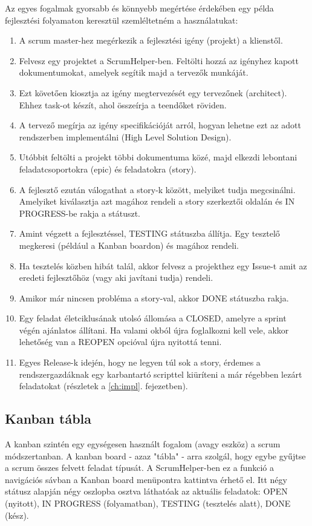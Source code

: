 Az egyes fogalmak gyorsabb és könnyebb megértése érdekében egy példa fejlesztési folyamaton keresztül szemléltetném a használatukat:

\begin{enumerate}
	\item A scrum master-hez megérkezik a fejlesztési igény (projekt) a klienstől.
	\item Felvesz egy projektet a ScrumHelper-ben. Feltölti hozzá az igényhez kapott dokumentumokat, amelyek segítik majd a tervezők munkáját.
	\item Ezt követően kiosztja az igény megtervezését egy tervezőnek (architect). Ehhez task-ot készít, ahol összeírja a teendőket röviden.
	\item A tervező megírja az igény specifikációját arról, hogyan lehetne ezt az adott rendszerben implementálni (High Level Solution Design).
	\item Utóbbit feltölti a projekt többi dokumentuma közé, majd elkezdi lebontani feladatcsoportokra (epic) és feladatokra (story).
	\item A fejlesztő ezután válogathat a story-k között, melyiket tudja megcsinálni. Amelyiket kiválasztja azt magához rendeli a story szerkeztői oldalán és IN PROGRESS-be rakja a státuszt.
	\item Amint végzett a fejlesztéssel, TESTING státuszba állítja. Egy tesztelő megkeresi (például a Kanban boardon) és magához rendeli.
	\item Ha tesztelés közben hibát talál, akkor felvesz a projekthez egy Issue-t amit az eredeti fejlesztőhöz (vagy aki javítani tudja) rendeli.
	\item Amikor már nincsen probléma a story-val, akkor DONE státuszba rakja.
	\item Egy feladat életciklusának utolsó állomása a CLOSED, amelyre a sprint végén ajánlatos állítani. Ha valami okból újra foglalkozni kell vele, akkor lehetőség van a REOPEN opcióval újra nyitottá tenni.
	\item Egyes Release-k idején, hogy ne legyen túl sok a story, érdemes a rendszergazdáknak egy karbantartó scripttel kiüríteni a már régebben lezárt feladatokat (részletek a \ref{ch:impl}. fejezetben).
\end{enumerate}

\subsection{Kanban tábla}
\label{kanbanboard}

A kanban szintén egy egységesen használt fogalom (avagy eszköz) a scrum módszertanban. A kanban board - azaz "tábla" - arra szolgál, hogy egybe gyűjtse a scrum összes felvett feladat típusát. A ScrumHelper-ben ez a funkció a navigációs sávban a Kanban board menüpontra kattintva érhető el. Itt négy státusz alapján négy oszlopba osztva láthatóak az aktuális feladatok: OPEN (nyitott), IN PROGRESS (folyamatban), TESTING (tesztelés alatt), DONE (kész).


